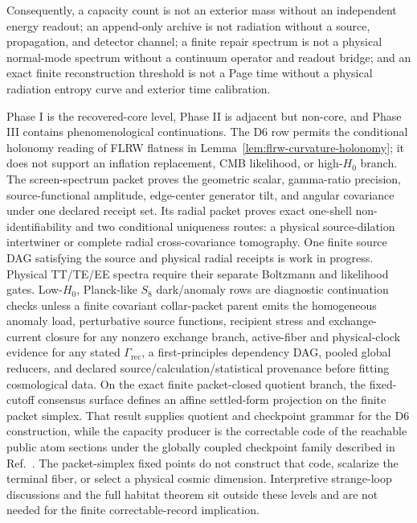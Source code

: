 \documentclass[11pt]{article}
\begin{document}
Consequently, a capacity count is not an exterior mass without an independent
energy readout; an append-only archive is not radiation without a source,
propagation, and detector channel; a finite repair spectrum is not a physical
normal-mode spectrum without a continuum operator and readout bridge; and an
exact finite reconstruction threshold is not a Page time without a physical
radiation entropy curve and exterior time calibration.

Phase I is the recovered-core level, Phase II is adjacent but non-core, and Phase III contains phenomenological continuations. The D6 row permits the conditional holonomy reading of FLRW flatness in Lemma~\ref{lem:flrw-curvature-holonomy}; it does not support an inflation replacement, CMB likelihood, or high-\(H_0\) branch. The screen-spectrum packet proves the geometric scalar, gamma-ratio precision, source-functional amplitude, edge-center generator tilt, and angular covariance under one declared receipt set. Its radial packet proves exact one-shell non-identifiability and two conditional uniqueness routes: a physical source-dilation intertwiner or complete radial cross-covariance tomography. One finite source DAG satisfying the source and physical radial receipts is work in progress. Physical TT/TE/EE spectra require their separate Boltzmann and likelihood gates. Low-\(H_0\), Planck-like \(S_8\) dark/anomaly rows are diagnostic continuation checks unless a finite covariant collar-packet parent emits the homogeneous anomaly load, perturbative source functions, recipient stress and exchange-current closure for any nonzero exchange branch, active-fiber and physical-clock evidence for any stated \(\Gamma_{\mathrm{rec}}\), a first-principles dependency DAG, pooled global reducers, and declared source/calculation/statistical provenance before fitting cosmological data. On the exact finite packet-closed quotient branch, the fixed-cutoff consensus surface defines an affine settled-form projection on the finite packet simplex. That result supplies quotient and checkpoint grammar for the D6 construction, while the capacity producer is the correctable code of the reachable public atom sections under the globally coupled checkpoint family described in Ref.~\cite{ophsynthesis}. The packet-simplex fixed points do not construct that code, scalarize the terminal fiber, or select a physical cosmic dimension. Interpretive strange-loop discussions and the full habitat theorem sit outside these levels and are not needed for the finite correctable-record implication.
\end{document}

